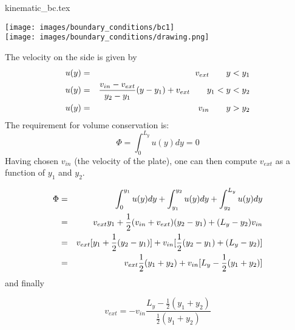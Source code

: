 \begin{flushright} {\tiny {\color{gray} kinematic\_bc.tex}} \end{flushright}


\begin{center}
\texttt{[image: images/boundary\_conditions/bc1]}\\
\texttt{[image: images/boundary\_conditions/drawing.png]}
\end{center}

The velocity on the side is given by
\begin{eqnarray}
u(y) &=& v_{ext} \quad\quad y<y_1 \nonumber\\
u(y) &=& \frac{v_{in}-v_{ext}}{y_2-y_1}(y-y_1) + v_{ext} \quad\quad y_1<y<y_2 \nonumber\\
u(y) &=& v_{in} \quad\quad y>y_2 \nonumber
\end{eqnarray}
The requirement for volume conservation is:
\[
\Phi=\int_{0}^{L_y} u(y) dy = 0
\]
Having chosen $v_{in}$ (the velocity of the plate), one can then compute $v_{ext}$
as a function of $y_1$ and $y_2$.

\begin{eqnarray}
\Phi
&=&\int_{0}^{y_1} u(y) dy  +\int_{y_1}^{y_2} u(y) dy +\int_{y_2}^{L_y} u(y) dy \nonumber\\
&=& v_{ext} y_1  + \frac{1}{2}(v_{in}+v_{ext})(y_2-y_1) + (L_y-y_2) v_{in} \nonumber\\
&=& v_{ext} [y_1 + \frac{1}{2}(y_2-y_1) ] + v_{in} [ \frac{1}{2}(y_2-y_1)  + (L_y-y_2) ] \nonumber\\
&=& v_{ext}\frac{1}{2} (y_1 + y_2 ) + v_{in} [ L_y - \frac{1}{2}(y_1+y_2) ] \nonumber
\end{eqnarray}
and finally
\begin{mdframed}[backgroundcolor=blue!5]
\[
v_{ext} = -v_{in} \frac{ L_y - \frac{1}{2}(y_1+y_2)}{ \frac{1}{2} (y_1 + y_2 ) }
\]
\end{mdframed}

